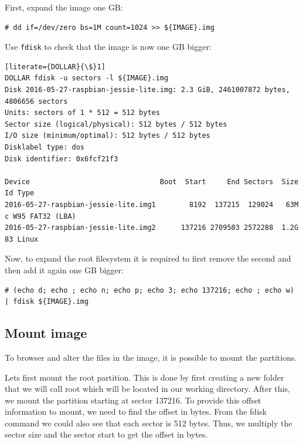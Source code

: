 First, expand the image one \ac{GB}:
\begin{lstlisting}[]
# dd if=/dev/zero bs=1M count=1024 >> ${IMAGE}.img
\end{lstlisting}
\FloatBarrier

Use \texttt{fdisk} to check that the image is now one \ac{GB} bigger:
\begin{lstlisting}[literate={DOLLAR}{\$}1]
DOLLAR fdisk -u sectors -l ${IMAGE}.img
Disk 2016-05-27-raspbian-jessie-lite.img: 2.3 GiB, 2461007872 bytes, 4806656 sectors
Units: sectors of 1 * 512 = 512 bytes
Sector size (logical/physical): 512 bytes / 512 bytes
I/O size (minimum/optimal): 512 bytes / 512 bytes
Disklabel type: dos
Disk identifier: 0x6fcf21f3

Device                               Boot  Start     End Sectors  Size Id Type
2016-05-27-raspbian-jessie-lite.img1        8192  137215  129024   63M  c W95 FAT32 (LBA)
2016-05-27-raspbian-jessie-lite.img2      137216 2709503 2572288  1.2G 83 Linux
\end{lstlisting}
\FloatBarrier

Now, to expand the root filesystem it is required to first remove the second
and then add it again one \ac{GB} bigger:

\begin{lstlisting}[]
# (echo d; echo ; echo n; echo p; echo 3; echo 137216; echo ; echo w) | fdisk ${IMAGE}.img
\end{lstlisting}
\FloatBarrier



\subsection{Mount image}

To browser and alter the files in the image, it is possible to mount the partitions.

Lets first mount the root partition. This is done by first creating a new folder
that we will call root which will be located in our working directory. After this,
we mount the partition starting at sector 137216. To provide this offset information
to mount, we need to find the offset in bytes. From the fdisk command we could also
see that each sector is 512 bytes. Thus, we multiply the sector size and the sector
start to get the offset in bytes.

